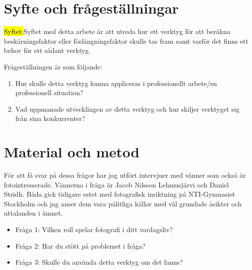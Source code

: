 \documentclass[11pt]{article}
\begin{document}
\section{Syfte och frågeställningar}
\hl{Syftet:}Syftet med detta arbete är att utreda hur ett verktyg för att beräkna beskärningsfaktor eller förlängningsfaktor skulle tas fram samt varför det finns ett behov för ett sådant verktyg. \par 
Frågeställningen är som följande: 

\begin{enumerate}
    \item Hur skulle detta verktyg kunna appliceras i professionellt arbete/en professionell situation?
    \item Vad uppmanade utvecklingen av detta verktyg och hur skiljer verktyget sig från sina konkurrenter?
\end{enumerate}

\section{Material och metod}
För att få svar på dessa frågor har jag utfört intervjuer med vänner som också är fotointresserade. Vännerna i fråga är Jacob Nilsson Lehmusjärvi och Daniel Stridh. Båda gick tidigare estet med fotografisk inriktning på NTI-Gymnasiet Stockholm och jag anser dem vara pålitliga källor med väl grundade åsikter och uttalanden i ämnet. \par
\begin{itemize}
    \item Fråga 1: Vilken roll spelar fotografi i ditt vardagsliv?
    \item Fråga 2: Har du stött på problemet i fråga?
    \item Fråga 3: Skulle du använda detta verktyg om det fanns?
\end{itemize}
\end{document}
